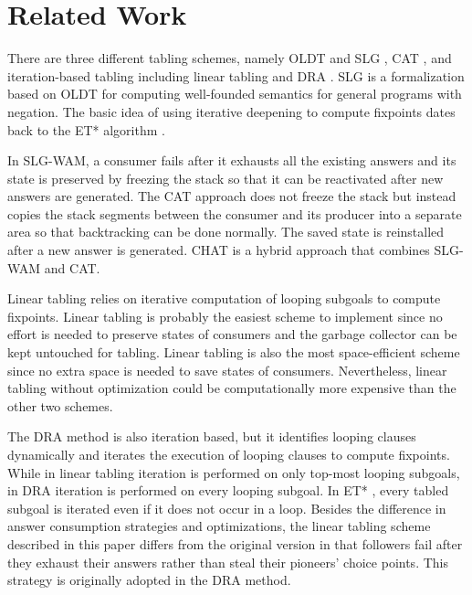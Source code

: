 \documentclass{tlp}
\begin{document}
\section{Related Work}
There are three different tabling schemes, namely OLDT and SLG \cite{Tamaki86,Sagonas98}, CAT \cite{Demoen98,Somogyi06}, and iteration-based tabling including linear tabling \cite{Shen99,Shen01,Zhou00,Zhou03,Zhou04} and DRA \cite{Guo01}. SLG \cite{Chen96} is a formalization based on OLDT for computing well-founded semantics for general programs with negation. The basic idea of using iterative deepening to compute fixpoints dates back to the ET* algorithm \cite{Dietrich87}.

In SLG-WAM, a consumer fails after it exhausts all the existing answers and its state is preserved by freezing the stack so that it can be reactivated after new answers are generated. The CAT approach does not freeze the stack but instead copies the stack segments between the consumer and its producer into a separate area so that backtracking can be done normally. The saved state is reinstalled after a new answer is generated. CHAT \cite{Demoen99} is a hybrid approach that combines SLG-WAM and CAT. 

Linear tabling relies on iterative computation of looping subgoals to compute fixpoints.  Linear tabling is probably the easiest scheme to implement since no effort is needed to preserve states of consumers and the garbage collector can be kept untouched for tabling. Linear tabling is also the most space-efficient scheme since no extra space is needed to save states of consumers. Nevertheless, linear tabling without optimization could be computationally more expensive than the other two schemes. 

The DRA method \cite{Guo01} is also iteration based, but it identifies looping clauses dynamically and iterates the execution of looping clauses to compute fixpoints. While in linear tabling iteration is performed on only top-most looping subgoals, in DRA iteration is performed on every looping subgoal. In ET* \cite{Dietrich87}, every tabled subgoal is iterated even if it does not occur in a loop. Besides the difference in answer consumption strategies and optimizations, the linear tabling scheme described in this paper differs from the original version \cite{Zhou00,Shen01} in that followers fail after they exhaust their answers rather than steal their pioneers' choice points. This strategy is originally adopted in the DRA method.
\end{document}
